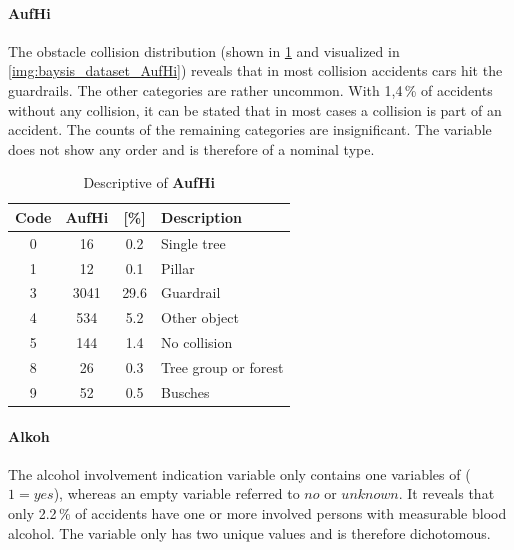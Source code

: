 \paragraph{AufHi}
\label{baysis_dataset_AufHi}
The obstacle collision distribution (shown in \cref{tbl:baysis_dataset_AufHi} and visualized in \cref{img:baysis_dataset_AufHi}) reveals that in most collision accidents cars hit the guardrails. The other categories are rather uncommon. With 1,4\,\% of accidents without any collision, it can be stated that in most cases a collision is part of an accident. The counts of the remaining categories are insignificant. The variable does not show any order and is therefore of a nominal type.
\begin{table}[ht]
	\centering
	\small
	\begin{tabular}{c|c|c|l} 
		\toprule
		Code & \textbf{AufHi} & [\%] & Description \\ 
		\midrule 
		0 & 16 		& 0.2	& Single tree \\
		1 & 12 		& 0.1	& Pillar \\
		3 & 3041	& 29.6	& Guardrail \\
		4 & 534		& 5.2	& Other object \\
		5 & 144		& 1.4	& No collision \\
		8 & 26		& 0.3	& Tree group or forest \\
		9 & 52		& 0.5	& Busches \\
		\bottomrule
	\end{tabular}
	\caption{Descriptive of \textbf{AufHi}}
	\label{tbl:baysis_dataset_AufHi}
	\vspace{-8mm}
\end{table}
\paragraph{Alkoh}
\label{baysis_dataset_Alkoh}
The alcohol involvement indication variable only contains one variables of ($1 = yes$), whereas an empty variable referred to $no$ or $unknown$. It reveals that only 2.2\,\% of accidents have one or more involved persons with measurable blood alcohol. The variable only has two unique values and is therefore dichotomous.
